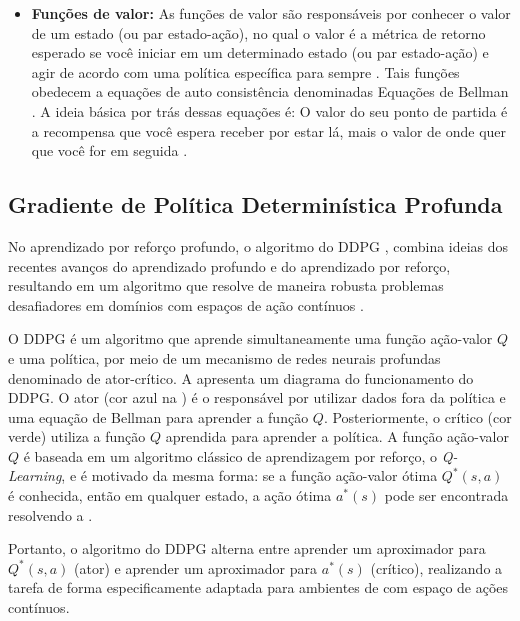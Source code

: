 \begin{itemize}
    \item \textbf{Funções de valor:} As funções de valor são responsáveis por conhecer o valor de um estado (ou par estado-ação), no qual o valor é a métrica de retorno esperado se você iniciar em um determinado estado (ou par estado-ação) e agir de acordo com uma política específica para sempre \cite{rl_intro}. Tais funções obedecem a equações de auto consistência denominadas Equações de Bellman \cite{bellman, rl_intro}. A ideia básica por trás dessas equações é: O valor do seu ponto de partida é a recompensa que você espera receber por estar lá, mais o valor de onde quer que você for em seguida \cite{bellman}.
    
\end{itemize}


\subsection{Gradiente de Política Determinística Profunda}
\label{sec:ddpg}

No aprendizado por reforço profundo, o algoritmo do \acrfull{DDPG} \cite{silver2014deterministic, ddpg}, combina ideias dos recentes avanços do aprendizado profundo e do aprendizado por reforço, resultando em um algoritmo que resolve de maneira robusta problemas desafiadores em domínios com espaços de ação contínuos \cite{ddpg}. 


O \acrshort{DDPG} é um algoritmo que aprende simultaneamente uma função ação-valor $Q$ e uma política, por meio de um mecanismo de redes neurais profundas denominado de ator-crítico. A  apresenta um diagrama do funcionamento do \acrshort{DDPG}. O ator (cor azul na ) é o responsável por utilizar dados fora da política e uma equação de Bellman para aprender a função $Q$. Posteriormente, o crítico (cor verde) utiliza a função $Q$ aprendida para aprender a política. A função ação-valor $Q$ é baseada em um algoritmo clássico de aprendizagem por reforço, o \emph{Q-Learning}, e é motivado da mesma forma: se a função ação-valor ótima $Q^*(s,a)$ é conhecida, então em qualquer estado, a ação ótima $a^*(s)$ pode ser encontrada resolvendo a .


Portanto, o algoritmo do \acrshort{DDPG} alterna entre aprender um aproximador para $Q^*(s,a)$ (ator) e aprender um aproximador para $a^*(s)$ (crítico), realizando a tarefa de forma especificamente adaptada para ambientes de com espaço de ações contínuos.

